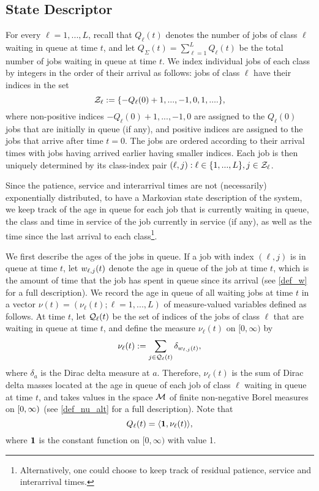 \documentclass{article}
\numberwithin{equation}{section}
\begin{document}



\subsection{State Descriptor} \label{sec_state}
For every $\ell=1,...,L$, recall that $Q_\ell(t)$ denotes the number of jobs of class $\ell$ waiting in queue at time $t$, and let $Q_\Sigma(t)=\sum_{\ell=1}^LQ_\ell(t)$ be the total number of jobs waiting in queue at time $t$. We index individual jobs of each class by integers in the order of their arrival as follows: jobs of class $\ell$ have their indices in the set
\[
\mathcal{Z}_\ell := \{-Q_\ell(0)+1,...,-1,0,1,....\},
\]
where non-positive indices $-Q_\ell(0)+1,...,-1,0$ are assigned to the $Q_\ell(0)$ jobs that are initially in queue (if any), and positive indices are assigned to the jobs that arrive after time $t=0$. The jobs are ordered according to their arrival times with jobs having arrived earlier having smaller indices. Each job is then uniquely determined by its class-index pair $(\ell,j): \ell\in\{1,...,L\}, j\in\mathcal{Z}_\ell$.

Since the patience, service  and interarrival times are not (necessarily) exponentially distributed, to have a Markovian state description of the system, we keep track of the age in queue for each job that is currently waiting in queue, the class and   time in service  of the job currently in  service (if any), as well as the time since the last arrival to each class\footnote{Alternatively, one could choose to keep track of residual patience, service and interarrival times.}. 

We first describe the ages of the jobs in queue.
If a job with index $(\ell,j)$ is in queue at time $t$,  let $w_{\ell,j}(t)$ denote the age in queue of the job at time $t$, which is the amount of time that the job has spent in queue since its arrival (see \eqref{def_w} for a full description). We record the age in queue of all waiting jobs at time $t$ in a vector $\nu(t)=(\nu_\ell(t);\ell=1,...,L)$ of measure-valued variables defined as follows. At time $t$, let $\mathcal{Q}_\ell(t)$ be the set of indices of the jobs of class $\ell$ that are waiting in queue at time $t$,  and define the measure $\nu_\ell(t)$ on $[0,\infty)$ by
\begin{equation}\label{def_nuk_early}
  \nu_\ell(t):= \sum_{j\in\mathcal{Q}_\ell(t)}\delta_{w_{\ell,j}(t)},
\end{equation}
where $\delta_a$ is the Dirac delta measure at $a$. Therefore, $\nu_\ell(t)$ is the sum of Dirac delta masses located at the age in queue of each job of class $\ell$ waiting in queue at time $t$, and takes values in the space $\mathcal{M}$ of finite non-negative Borel measures on $[0,\infty)$ (see \eqref{def_nu_alt} for a full description).  Note that 
\begin{equation}
  \ql_\ell(t)=\langle\f1,\nu_\ell(t)\rangle,
\end{equation}
where $\f1$ is the constant function on $[0,\infty)$ with value 1.
\end{document}
